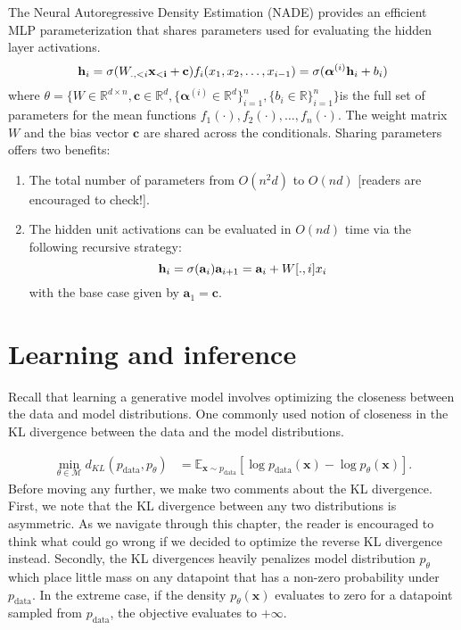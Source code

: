 The Neural Autoregressive Density Estimation (NADE) provides an efficient MLP parameterization that shares parameters used for evaluating the hidden layer activations.
\[
\mathbf{h}_i = \sigma(W_{., <i} \mathbf{x_{<i}} + \mathbf{c})\\
f_i(x_1, x_2, \ldots, x_{i-1}) =\sigma(\boldsymbol{\alpha}^{(i)}\mathbf{h}_i +b_i )  
\]
where $\theta=\{W\in \mathbb{R}^{d\times n}, \mathbf{c} \in \mathbb{R}^d, \{\boldsymbol{\alpha}^{(i)}\in \mathbb{R}^d\}^n_{i=1}, \{b_i \in \mathbb{R}\}^n_{i=1}\}$is the full set of parameters for the mean functions $f_1(\cdot), f_2(\cdot), \ldots, f_n(\cdot)$. The weight matrix $W$ and the bias vector $\mathbf{c}$ are shared across the conditionals. Sharing parameters offers two benefits:
\begin{enumerate}
\item The total number of parameters from $O(n^2 d)$ to $O(nd)$ [readers are encouraged to check!].
\item The hidden unit activations can be evaluated in $O(nd)$ time via the following recursive strategy:
\[
\mathbf{h}_i = \sigma(\mathbf{a}_i)\\
\mathbf{a}_{i+1} = \mathbf{a}_{i} + W[., i]x_i
\]
with the base case given by $\mathbf{a}_1=\mathbf{c}$.
\end{enumerate}


\section{Learning and inference}

Recall that learning a generative model involves optimizing the closeness between the data and model distributions. One commonly used notion of closeness in the KL divergence between the data and the model distributions.

$$
\begin{align*}
\min_{\theta\in \mathcal{M}}d_{KL}(p_{\mathrm{data}}, p_{\theta}) &= \mathbb{E}_{\mathbf{x} \sim p_{\mathrm{data}} }\left[\log p_{\mathrm{data}}(\mathbf{x}) - \log p_{\theta}(\mathbf{x})\right].
\end{align*}
$$
Before moving any further, we make two comments about the KL divergence. First, we note that the KL divergence between any two distributions is asymmetric. As we navigate through this chapter, the reader is encouraged to think what could go wrong if we decided to optimize the reverse KL divergence instead. Secondly, the KL divergences heavily penalizes model distribution $p_\theta$ which place little mass on any datapoint that has a non-zero probability under $p_{\mathrm{data}}$. In the extreme case, if the density $p_\theta(\mathbf{x})$ evaluates to zero for a datapoint sampled from $p_{\mathrm{data}}$, the objective evaluates to $+\infty$. 

